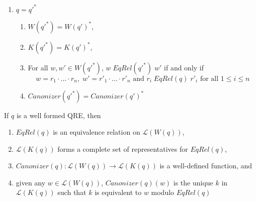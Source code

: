 \documentclass{svproc}
\begin{document}
\begin{enumerate}
\begin{center}
\begin{prooftree}
\end{prooftree}
\end{center}
\item $q=q'^*$
\begin{center}
\begin{enumerate}
  \item $W(q'^*) = W(q')^*$,
  \item $K(q'^*) = K(q')^*$, 
  \item
For all $w, w' \in W(q'^*)$, $w \; EqRel(q'^*) \; w'$ if and
only if 
$$w = r_1 \cdot \ldots \cdot r_n, \; w' = {r'}_1 \cdot \ldots
      \cdot {r'}_n \text{ and } r_i \; EqRel(q) \; {r'}_i
      \text{ for all } 1 \leq i \leq n$$
      \item
$Canonizer(q'^*) = Canonizer(q')^* $
\end{enumerate}
\begin{prooftree}
\end{prooftree}
\end{center}
\end{enumerate}
\begin{claim}
If $q$ is a well formed QRE, then
\begin{enumerate}
  \item  $EqRel(q)$ is an equivalence relation on $\mathcal{L}(W(q))$,
  \item  $\mathcal{L}(K(q))$ forms a complete set of representatives for
  $EqRel(q)$,
  \item $Canonizer(q):\mathcal{L}(W(q)) \longrightarrow \mathcal{L}(K(q))$ is a
  well-defined function, and
  \item  given any $w \in \mathcal{L}(W(q))$, $Canonizer(q)(w)$ is the unique
  $k$ in $\mathcal{L}(K(q))$ such that $k$ is equivalent to $w$ modulo
  $EqRel(q)$
  \end{enumerate}
\end{claim}
\end{document}
